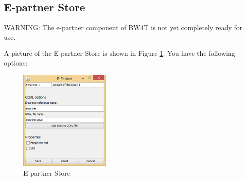 \subsection{E-partner Store}
WARNING: The e-partner component of BW4T is not yet completely ready for use.

A picture of the E-partner Store is shown in Figure \ref{fig:epartnerstore}. You have the following options:

\begin{figure}[h]
\begin{center}
\includegraphics[width=0.4\textwidth]{ScenarioEditor/es.png}
\end{center}
\caption{E-partner Store}
\label{fig:epartnerstore}
\end{figure}

